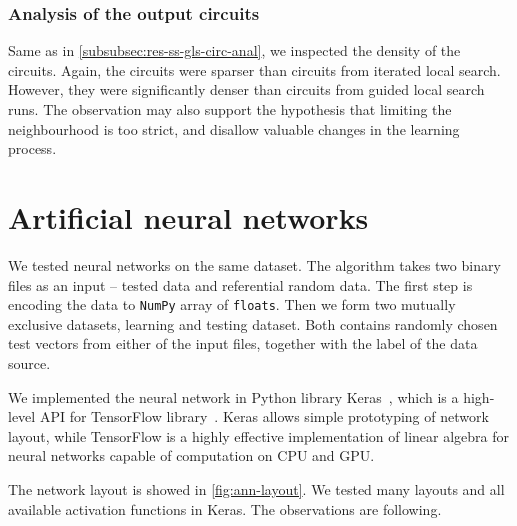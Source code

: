 \documentclass[
  print, %
  Table,   %
  nolof,     %
  nolot,     %
  11pt, %
  oneside  %
]{fithesis3}
\begin{document}
\subsubsection{\textbf{Analysis of the output circuits}}
\label{subsubsec:res-ss-vns-circ-anal}

Same as in \cref{subsubsec:res-ss-gls-circ-anal}, we inspected the density of the circuits. Again, the circuits were sparser than circuits from iterated local search. However, they were significantly denser than circuits from guided local search runs. The observation may also support the hypothesis that limiting the neighbourhood is too strict, and disallow valuable changes in the learning process.


\section{Artificial neural networks}
\label{sec:res-ann}

We tested neural networks on the same dataset. The algorithm takes two binary files as an input -- tested data and referential random data. The first step is encoding the data to \texttt{NumPy} array of \texttt{floats}. Then we form two mutually exclusive datasets, learning and testing dataset. Both contains randomly chosen test vectors from either of the input files, together with the label of the data source.

We implemented the neural network in Python library Keras~\cite{chollet2015keras}, which is a high-level API for TensorFlow library~\cite{abadi2016tensorflow}. Keras allows simple prototyping of network layout, while TensorFlow is a highly effective implementation of linear algebra for neural networks capable of computation on CPU and GPU.

The network layout is showed in \cref{fig:ann-layout}. We tested many layouts and all available activation functions in Keras. The observations are following.
\end{document}
